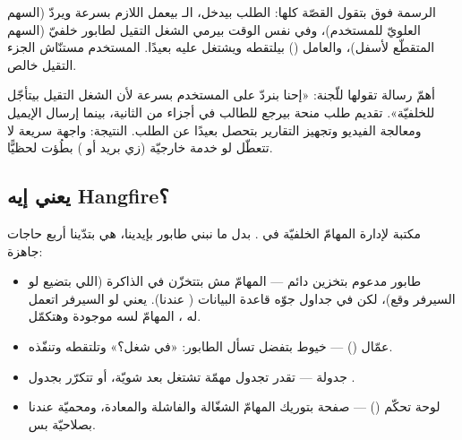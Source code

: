 \begin{center}\begin{LTR}
\end{LTR}\end{center}

الرسمة فوق بتقول القصّة كلها: الطلب بيدخل، الـ بيعمل اللازم بسرعة ويردّ (السهم
العلويّ للمستخدم)، وفي نفس الوقت بيرمي الشغل التقيل لطابور خلفيّ (السهم المتقطّع لأسفل)،
والعامل () بيلتقطه ويشتغل عليه بعيدًا. المستخدم مستنّاش الجزء التقيل خالص.

\begin{spotlight}
أهمّ رسالة تقولها للّجنة: «إحنا بنردّ على المستخدم بسرعة لأن الشغل التقيل بيتأجّل
للخلفيّة». تقديم طلب منحة بيرجع للطالب في أجزاء من الثانية، بينما إرسال الإيميل ومعالجة
الفيديو وتجهيز التقارير بتحصل بعيدًا عن الطلب. النتيجة: واجهة سريعة لا تتعطّل لو خدمة
خارجيّة (زي بريد أو ) بطُؤت لحظيًّا.
\end{spotlight}

\subsection{يعني إيه Hangfire؟}

 مكتبة لإدارة المهامّ الخلفيّة في . بدل ما نبني طابور بإيدينا، هي
بتدّينا أربع حاجات جاهزة:

\begin{itemize}
  \item طابور مدعوم بتخزين دائم — المهامّ مش بتتخزّن في الذاكرة (اللي بتضيع لو
  السيرفر وقع)، لكن في جداول جوّه قاعدة البيانات ( عندنا). يعني لو السيرفر
  اتعمل له ، المهامّ لسه موجودة وهتكمّل.
  \item عمّال () — خيوط بتفضل تسأل الطابور: «في شغل؟» وتلتقطه وتنفّذه.
  \item جدولة — تقدر تجدول مهمّة تشتغل بعد شويّة، أو تتكرّر بجدول .
  \item لوحة تحكّم () — صفحة بتوريك المهامّ الشغّالة والفاشلة
  والمعادة، ومحميّة عندنا بصلاحيّة  بس.
\end{itemize}

